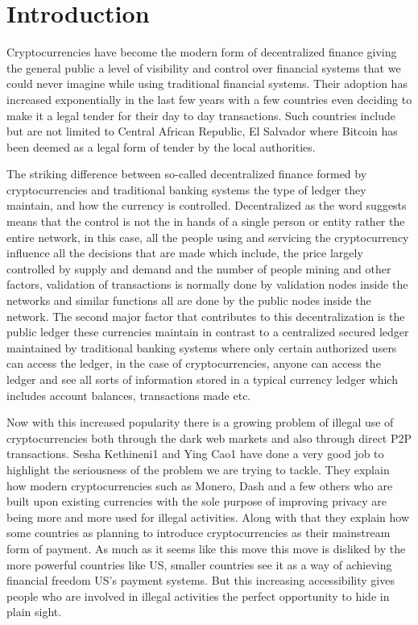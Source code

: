 \documentclass{article}
\begin{document}
\pagebreak

\section{Introduction}
Cryptocurrencies have become the modern form of decentralized finance giving the general public a level of visibility and control over financial systems that we could never imagine while using traditional financial systems. Their adoption has increased exponentially in the last few years with a few countries even deciding to make it a legal tender for their day to day transactions. Such countries include but are not limited to Central African Republic, El Salvador \cite{browne_2022} where Bitcoin has been deemed as a legal form of tender by the local authorities. 

The striking difference between so-called decentralized finance\cite{zetzsche_arner_buckley_2020} formed by cryptocurrencies and traditional banking systems the type of ledger they maintain, and how the currency is controlled. Decentralized as the word suggests means that the control is not the in hands of a single person or entity rather the entire network, in this case, all the people using and servicing the cryptocurrency influence all the decisions that are made which include, the price largely controlled by supply and demand and the number of people mining and other factors, validation of transactions is normally done by validation nodes inside the networks and similar functions all are done by the public nodes inside the network. The second major factor that contributes to this decentralization is the public ledger these currencies maintain in contrast to a centralized secured ledger maintained by traditional banking systems where only certain authorized users can access the ledger, in the case of cryptocurrencies, anyone can access the ledger and see all sorts of information stored in a typical currency ledger which includes account balances, transactions made etc. 

Now with this increased popularity there is a growing problem of illegal use of cryptocurrencies both through the dark web markets and also through direct P2P transactions. Sesha Kethineni1 and Ying Cao1 \cite{kethineni_cao_2019} have done a very good job to highlight the seriousness of the problem we are trying to tackle. They explain how modern cryptocurrencies such as Monero\cite{getmonero.org}, Dash\cite{dash_2022} and a few others who are built upon existing currencies with the sole purpose of improving privacy are being more and more used for illegal activities. Along with that they explain how some countries as planning to introduce cryptocurrencies as their mainstream form of payment. As much as it seems like this move this move is disliked by the more powerful countries like US, smaller countries see it as a way of achieving financial freedom US's payment systems. But this increasing accessibility gives people who are involved in illegal activities the perfect opportunity to hide in plain sight. 
\end{document}
